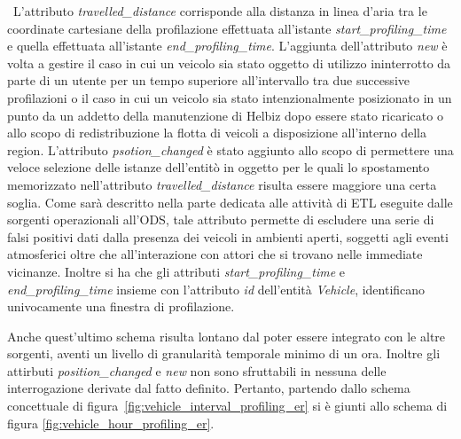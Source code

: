 \noindent~L'attributo \textit{travelled\_distance} corrisponde alla distanza in linea
d'aria tra le coordinate cartesiane della profilazione effettuata all'istante
\textit{start\_profiling\_time} e quella effettuata all'istante
\textit{end\_profiling\_time}.
L'aggiunta dell'attributo \textit{new} è volta a gestire il caso in cui un
veicolo sia stato oggetto di utilizzo ininterrotto da parte di un utente per
un tempo superiore all'intervallo tra due successive profilazioni o il caso in
cui un veicolo sia stato intenzionalmente posizionato in un punto da un addetto
della manutenzione di Helbiz dopo essere stato ricaricato o allo scopo di
redistribuzione la flotta di veicoli a disposizione all'interno della region.
L'attributo \textit{psotion\_changed} è stato aggiunto allo scopo di permettere
una veloce selezione delle istanze dell'entitò in oggetto per le quali lo
spostamento memorizzato nell'attributo \textit{travelled\_distance} risulta essere
maggiore una certa soglia. Come sarà descritto nella parte dedicata alle attività di
ETL eseguite dalle sorgenti operazionali all'ODS, tale attributo permette di
escludere una serie di falsi positivi dati dalla presenza dei veicoli in ambienti
aperti, soggetti agli eventi atmosferici oltre che all'interazione con attori
che si trovano nelle immediate vicinanze.
Inoltre si ha che gli attributi \textit{start\_profiling\_time} e
\textit{end\_profiling\_time} insieme con l'attributo \textit{id} dell'entità
\textit{Vehicle}, identificano univocamente una finestra di profilazione.

Anche quest'ultimo schema risulta lontano dal poter essere integrato con le altre
sorgenti, aventi un livello di granularità temporale minimo di un ora.
Inoltre gli attirbuti \textit{position\_changed} e \textit{new} non sono
sfruttabili in nessuna delle interrogazione derivate dal fatto definito.
Pertanto, partendo dallo schema concettuale di
figura~\ref{fig:vehicle_interval_profiling_er} si è giunti allo schema di figura
\ref{fig:vehicle_hour_profiling_er}.

